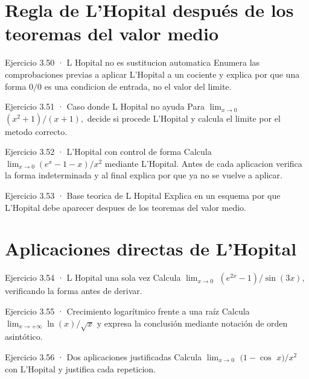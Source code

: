 \documentclass[10pt,a4paper,oneside,openany]{book}
\begin{document}
\section{Regla de L'Hopital después de los teoremas del valor medio}
\begin{PSevenExerciseFixed}{Ejercicio 3.50 · L Hopital no es sustitucion automatica}
Enumera las comprobaciones previas a aplicar L'Hopital a un cociente y explica por que una forma \(0/0\) es una condicion de entrada, no el valor del limite.
\end{PSevenExerciseFixed}
\begin{PSevenExerciseFixed}{Ejercicio 3.51 · Caso donde L Hopital no ayuda}
Para \(\lim_{x\to 0}\) \((x^{2}+1)/(x+1),\) decide si procede L'Hopital y calcula el limite por el metodo correcto.
\end{PSevenExerciseFixed}
\begin{PSevenExerciseFixed}{Ejercicio 3.52 · L'Hopital con control de forma}
Calcula \(\lim_{x\to 0}(e^x-1-x)/x^{2}\) mediante L'Hopital. Antes de cada aplicacion verifica la forma indeterminada y al final explica por que ya no se vuelve a aplicar.
\end{PSevenExerciseFixed}
\begin{PSevenExerciseFixed}{Ejercicio 3.53 · Base teorica de L Hopital}
Explica en un esquema por que L'Hopital debe aparecer despues de los teoremas del valor medio.
\end{PSevenExerciseFixed}
\section{Aplicaciones directas de L'Hopital}
\begin{PSevenExerciseFixed}{Ejercicio 3.54 · L Hopital una sola vez}
Calcula \(\lim_{x\to 0}\) \((e^{2x}-1)/\sin(3x),\) verificando la forma antes de derivar.
\end{PSevenExerciseFixed}
\begin{PSevenExerciseFixed}{Ejercicio 3.55 · Crecimiento logarítmico frente a una raíz}
Calcula \(\lim_{x\to+\infty}\ln(x)/\sqrt{x}\) y expresa la conclusión mediante notación de orden asintótico.
\end{PSevenExerciseFixed}
\begin{PSevenExerciseFixed}{Ejercicio 3.56 · Dos aplicaciones justificadas}
Calcula \(\lim_{x\to 0}\) \((1-\cos\) \(x)/x^{2}\) con L'Hopital y justifica cada repeticion.
\end{PSevenExerciseFixed}
\end{document}
